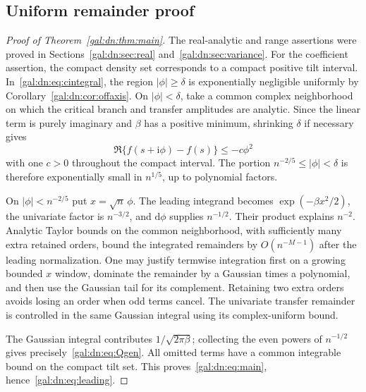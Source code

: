 \documentclass[11pt,letterpaper]{article}
\numberwithin{equation}{section}
\theoremstyle{definition}\newtheorem{definition}[theorem]{Definition}
\theoremstyle{remark}\newtheorem{remark}[theorem]{Remark}
\newcommand{\ii}{\mathrm i}
\newcommand{\dd}{\mathrm d}
\begin{document}
\subsection{Uniform remainder proof}
\begin{proof}[Proof of Theorem~\ref{gal:dn:thm:main}]
The real-analytic and range assertions were proved in Sections~\ref{gal:dn:sec:real} and~\ref{gal:dn:sec:variance}. For the coefficient assertion, the compact density set corresponds to a compact positive tilt interval. In~\eqref{gal:dn:eq:cintegral}, the region $|\phi|\geq\delta$ is exponentially negligible uniformly by Corollary~\ref{gal:dn:cor:offaxis}. On $|\phi|<\delta$, take a common complex neighborhood on which the critical branch and transfer amplitudes are analytic. Since the linear term is purely imaginary and $\beta$ has a positive minimum, shrinking $\delta$ if necessary gives
\[
 \Re\{f(s+\ii\phi)-f(s)\}\leq-c\phi^2
\]
with one $c>0$ throughout the compact interval. The portion $n^{-2/5}\leq|\phi|<\delta$ is therefore exponentially small in $n^{1/5}$, up to polynomial factors.

On $|\phi|<n^{-2/5}$ put $x=\sqrt n\,\phi$. The leading integrand becomes $\exp(-\beta x^2/2)$, the univariate factor is $n^{-3/2}$, and $\dd\phi$ supplies $n^{-1/2}$. Their product explains $n^{-2}$. Analytic Taylor bounds on the common neighborhood, with sufficiently many extra retained orders, bound the integrated remainders by $O(n^{-M-1})$ after the leading normalization. One may justify termwise integration first on a growing bounded $x$ window, dominate the remainder by a Gaussian times a polynomial, and then use the Gaussian tail for its complement. Retaining two extra orders avoids losing an order when odd terms cancel. The univariate transfer remainder is controlled in the same Gaussian integral using its complex-uniform bound.

The Gaussian integral contributes $1/\sqrt{2\pi\beta}$; collecting the even powers of $n^{-1/2}$ gives precisely~\eqref{gal:dn:eq:Qgen}. All omitted terms have a common integrable bound on the compact tilt set. This proves~\eqref{gal:dn:eq:main}, hence~\eqref{gal:dn:eq:leading}.
\end{proof}
\end{document}
